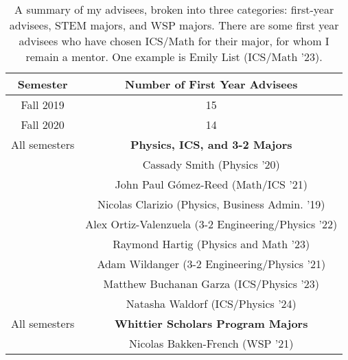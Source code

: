 \documentclass[../../../main.tex]{subfiles}
\begin{document}
\begin{table}
\centering
\begin{tabular}{| c | c |}
\hline
\hline
Semester & \textbf{Number of First Year Advisees} \\ \hline
Fall 2019 & 15 \\ \hline
Fall 2020 & 14 \\ \hline
\hline
All semesters & \textbf{Physics, ICS, and 3-2 Majors} \\ \hline 
& Cassady Smith (Physics '20) \\ \hline
& John Paul G\'{o}mez-Reed (Math/ICS '21) \\ \hline
& Nicolas Clarizio (Physics, Business Admin. '19) \\ \hline
& Alex Ortiz-Valenzuela (3-2 Engineering/Physics  '22) \\ \hline
& Raymond Hartig (Physics and Math '23) \\ \hline
& Adam Wildanger (3-2 Engineering/Physics '21) \\ \hline
& Matthew Buchanan Garza (ICS/Physics '23) \\ \hline
& Natasha Waldorf (ICS/Physics '24) \\ \hline \hline
All semesters & \textbf{Whittier Scholars Program Majors} \\ \hline
& Nicolas Bakken-French (WSP '21) \\ \hline
\end{tabular}
\caption{\label{tab:advisees} A summary of my advisees, broken into three categories: first-year advisees, STEM majors, and WSP majors.  There are some first year advisees who have chosen ICS/Math for their major, for whom I remain a mentor.  One example is Emily List (ICS/Math '23).}
\end{table}
\end{document}
